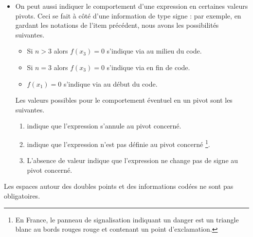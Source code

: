 \begin{enumerate}
\begin{itemize}
        \item On peut aussi indiquer le comportement d'une expression en certaines valeurs pivots. Ceci se fait à côté d'une information de type signe : par exemple, en gardant les notations de l'item précédent, nous avons les possibilités suivantes.
        \begin{itemize}
            \item Si $n > 3$ alors $f(x_3) = 0$ s'indique via  au milieu du code.

            \item Si $n = 3$ alors $f(x_3) = 0$ s'indique via  en fin de code.

            \item $f(x_1) = 0$ s'indique via     au début du code.
        \end{itemize}
        Les valeurs possibles pour le comportement éventuel en un pivot sont les suivantes.
        \begin{enumerate}
            \item {} indique que
l'expression s'annule au pivot concerné.

            \item \tdocinlatex{!} indique que
l'expression n'est pas définie au pivot concerné
            \footnote{
                En France, le panneau de signalisation indiquant un danger est un triangle blanc au bords rouges rouge et contenant un point d'exclamation.
            }.

            \item L'absence de valeur indique que l'expression ne change pas de signe au pivot concerné.
        \end{enumerate}
    \end{itemize}
\end{enumerate}








\begin{tdocnote}
    Les espaces autour des doubles points et des informations codées ne sont pas obligatoires.
\end{tdocnote}




